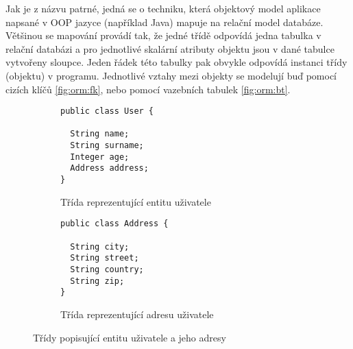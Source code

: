 Jak je z názvu patrné, jedná se o techniku, která objektový model aplikace napsané v OOP jazyce (například Java) mapuje na relační model databáze. Většinou se mapování provádí tak, že jedné třídě odpovídá jedna tabulka v relační databázi a pro jednotlivé skalární atributy objektu jsou v dané tabulce vytvořeny sloupce. Jeden řádek této tabulky pak obvykle odpovídá instanci třídy (objektu) v programu. Jednotlivé vztahy mezi objekty se modelují buď pomocí cizích klíčů \ref{fig:orm:fk}, nebo pomocí vazebních tabulek \ref{fig:orm:bt}.

\begin{figure}[!h]
\begin{subfigure}[b]{0.45\textwidth}
\caption{Třída reprezentující entitu uživatele}
\label{code:java:user}
\centering
\begin{lstlisting}
public class User {

  String name;
  String surname;
  Integer age;
  Address address;
}
\end{lstlisting}
\end{subfigure}
\begin{subfigure}[b]{0.45\textwidth}
\caption{Třída reprezentující adresu uživatele}
\centering
\begin{lstlisting}
public class Address {

  String city;
  String street;
  String country;
  String zip;
}
\end{lstlisting}
\end{subfigure}
\caption{Třídy popisující entitu uživatele a jeho adresy}\label{fig:orm:class}
\end{figure}

